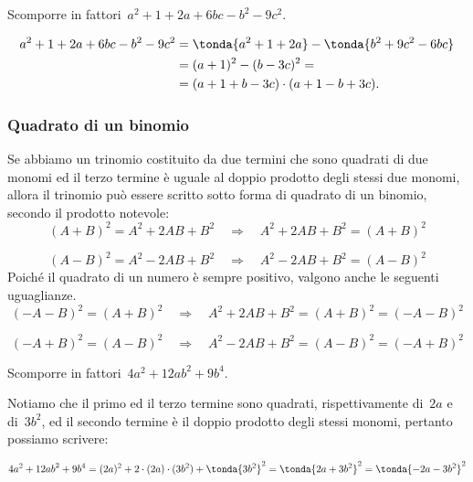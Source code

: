 \begin{esempio}{}{}
Scomporre in fattori~\(a^{2}+1+2a+6bc-b^{2}-9c^{2}\).

\vspace{-1.0em}
\begin{equation*}
  \begin{split}
    a^{2}+1+2a+6bc-b^{2}-9c^{2} 
    &=\tonda{a^{2}+1+2a}-\tonda{b^{2}+9c^{2}-6{bc}} \\
    &= (a+1)^{2}-(b-3c)^{2}=\\
    &= (a+1+b-3c)\cdot (a+1-b+3c).
  \end{split}
\end{equation*}
\end{esempio}
% 
\subsubsection{Quadrato di un binomio}
\label{subsubsec:divpol_quadbin}

Se abbiamo un trinomio costituito da due termini che sono quadrati di 
due monomi ed il terzo termine è uguale al doppio prodotto degli stessi 
due monomi, allora il trinomio può essere scritto sotto forma di 
quadrato di un binomio, secondo il prodotto notevole:
\[(A+B)^{2}=A^{2}+2AB+B^{2}\quad \Rightarrow \quad 
  A^{2}+2AB+B^{2}=(A+B)^{2}\]

\vspace{-2.0em}
\[(A-B)^{2}=A^{2}-2AB+B^{2}\quad \Rightarrow \quad 
  A^{2}-2AB+B^{2}=(A-B)^{2}\]
Poiché il quadrato di un numero è sempre positivo, valgono anche le seguenti 
uguaglianze.
\[(-A-B)^{2}=(A+B)^{2}\quad\Rightarrow\quad 
  A^{2}+2AB+B^{2}=(A+B)^{2}=(-A-B)^{2}\]

\vspace{-3.0em}               %
\[(-A+B)^{2}=(A-B)^{2}\quad \Rightarrow \quad 
A^{2}-2AB+B^{2}=(A-B)^{2}=(-A+B)^{2}\]

\begin{esempio}{}{}
Scomporre in fattori~\(4a^{2}+12ab^{2}+9b^{4}\).

Notiamo che il primo ed il terzo termine sono quadrati, rispettivamente 
di~\(2a\) e di~\(3b^{2}\), ed il secondo termine è il doppio prodotto 
degli stessi monomi, pertanto possiamo scrivere:

\vspace{-2.0em}
\[4a^{2}+12{ab}^{2}+9b^{4}=(2a)^{2}+2 \cdot (2a) \cdot (3b^{2})+
  \tonda{3b^{2}}^{2}=\tonda{2a+3b^{2}}^{2}=\tonda{-2a-3b^{2}}^{2}\]
\end{esempio}

